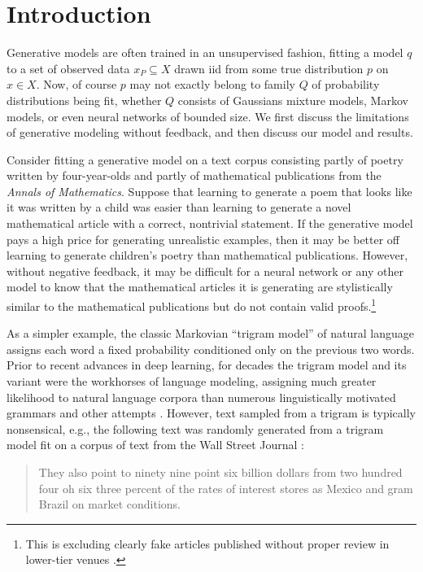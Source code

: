 \section{Introduction}
\label{sec:intro}
Generative models are often trained in an unsupervised fashion, fitting a model $q$ to a set of observed data $x_P \subseteq X$ drawn iid from some true distribution $p$ on $x\in X$. Now, of course $p$ may not exactly belong to family $Q$ of probability distributions being fit, whether $Q$ consists of Gaussians mixture models, Markov models, or even neural networks of bounded size. We first discuss the limitations of generative modeling without feedback, and then discuss our model and results.

Consider fitting a generative model on a text corpus consisting partly of poetry written by four-year-olds and partly of mathematical publications from the {\em Annals of Mathematics}. Suppose that learning to generate a poem that looks like it was written by a child was easier than learning to generate a novel mathematical article with a correct, nontrivial statement. If the generative model pays a high price for generating unrealistic examples, then it may be better off learning to generate children's poetry than mathematical publications. However, without negative feedback, it may be difficult for a neural network or any other model to know that the mathematical articles it is generating are stylistically similar to the mathematical publications but do not contain valid proofs.\footnote{This is excluding clearly fake articles published without proper review in lower-tier venues \citep{LabbeL13}.} 

As a simpler example, the classic Markovian ``trigram model'' of natural language assigns each word a fixed probability conditioned only on the previous two words. Prior to recent advances in deep learning, for decades the trigram model and its variant were the workhorses of language modeling, assigning much greater likelihood to natural language corpora than numerous linguistically motivated grammars and other attempts \citep{Rosenfeld00}. However, text sampled from a trigram is typically nonsensical, e.g., the following text was randomly generated from a trigram model fit on a corpus of text from the Wall Street Journal \citep{JurafskyM09}:
\begin{quote}
They also point to ninety nine point six billion dollars from two hundred
four oh six three percent of the rates of interest stores as Mexico and
gram Brazil on market conditions. 
\end{quote}

